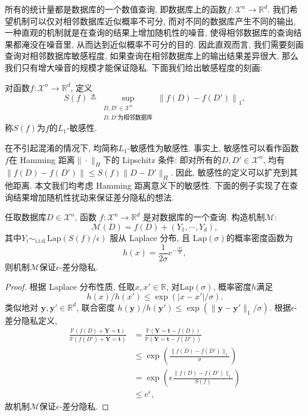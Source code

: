 所有的统计量都是数据库的一个数值查询, 即数据库上的函数$f : \mathcal{X}^n \to \mathbb R^d$. 我们希望机制可以仅对相邻数据库近似概率不可分, 而对不同的数据库产生不同的输出, 一种直观的机制就是在查询的结果上增加随机性的噪音, 使得相邻数据库的查询结果都淹没在噪音里, 从而达到近似概率不可分的目的. 因此直观而言, 我们需要刻画查询对相邻数据库敏感程度, 如果查询在相邻数据库上的输出结果差异很大, 那么我们只有增大噪音的规模才能保证隐私. 下面我们给出敏感程度的刻画:
\begin{defn}[$L_1$-敏感性]
  对函数$f : \mathcal{X}^n \to \mathbb R^d$, 定义
  \[
  S(f) \triangleq \sup_{\substack{D, D'\in \mathcal{X}^n \\ \text{$D, D'$为相邻数据库}}}\left\| f(D) - f(D') \right\|_1,
  \]
  称$S(f)$为$f$的$L_1$-敏感性.
\end{defn}
在不引起混淆的情况下, 均简称$L_1$-敏感性为敏感性. 事实上, 敏感性可以看作函数 $f$在 Hamming 距离$\|\cdot\|_H$下的 Lipschitz 条件: 即对所有的$D, D'\in\mathcal {X}^n$, 均有$\|f(D) - f(D')\| \le S(f) \| D - D'\|_H$. 因此, 敏感性的定义可以扩充到其他距离. 本文我们均考虑 Hamming 距离意义下的敏感性. 下面的例子实现了在查询结果增加随机性扰动来保证差分隐私的想法.

\begin{example}\label{exa:单个查询的Laplace机制}
  任取数据库$D \in \mathcal{X}^n$, 函数 $f : \mathcal{X}^n \to \mathbb R^d$ 是对数据库的一个查询. 构造机制$\mathcal{M}$:
  \[
  \mathcal{M}(D) = f(D) + (Y_1, \cdots, Y_d),
  \]
  其中$Y_i \sim_{\text{i.i.d.}} \mathrm{Lap}(S(f)/\epsilon)$ 服从 Laplace 分布, 且 $\mathrm{Lap}(\sigma)$的概率密度函数为
  \[
  h(x) = \frac{1}{2\sigma} e^{ - \frac{|x|}{\sigma}},
  \]
  则机制$\mathcal{M}$保证$\epsilon$-差分隐私.
\end{example}
\begin{proof}
  根据 Laplace 分布性质, 任取$x, x' \in \mathbb R$, 对$\mathrm{Lap}(\sigma)$, 概率密度$h$满足
  \[
  h(x)/h(x') \le \exp ( | x - x'| / \sigma).
  \]
  类似地对 $\mathbf{y}, \mathbf{y}' \in\mathbb R^d$, 联合密度 $h(\mathbf{y})/h(\mathbf{y}') \le \exp( \|\mathbf{y} - \mathbf{y}'\|_1 / \sigma)$. 根据$\epsilon$-差分隐私定义, 
  \[
  \begin{split}
    \frac{\mathbb{P}(f(D) + \mathbf{Y} = \mathbf{t})}{\mathbb{P}(f(D') + \mathbf{Y} = \mathbf{t})} &=  \frac{\mathbb{P}(\mathbf{Y} = \mathbf{t} - f(D))}{\mathbb{P}(\mathbf{Y} = \mathbf{t} - f(D'))} \\
    & \le \exp \left( \frac{\| f(D) - f(D') \|_1}{\sigma} \right) \\
    & = \exp \left( \epsilon \frac{\| f(D) - f(D') \|_1}{S(f)} \right) \\
    & \le e^\epsilon,
  \end{split}
  \]
  故机制$\mathcal{M}$保证$\epsilon$-差分隐私.
\end{proof}

